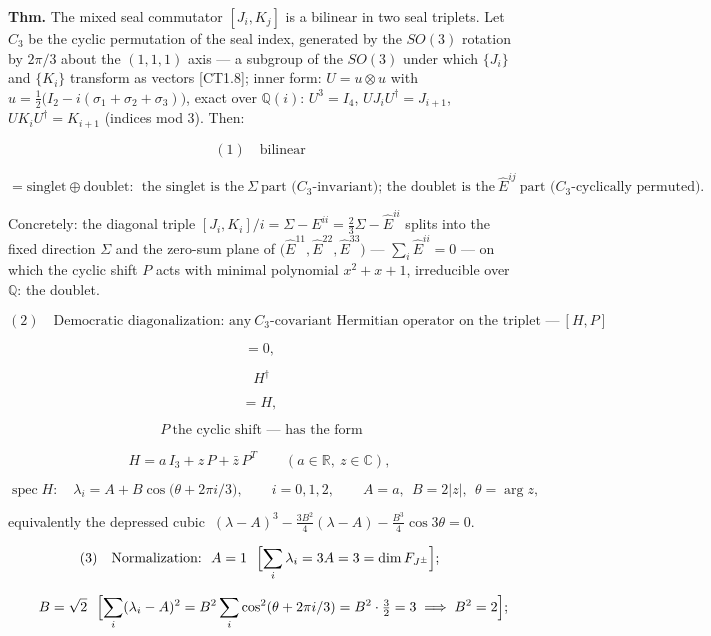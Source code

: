 \begin{theorem}\label{tag:FT-111}
\textbf{Thm.} The mixed seal commutator $[J_i,K_j]$ is a bilinear in two seal triplets. Let $C_3$ be the cyclic permutation of the seal index, generated by the $SO(3)$ rotation by $2\pi/3$ about the $(1,1,1)$ axis — a subgroup of the $SO(3)$ under which $\{J_i\}$ and $\{K_i\}$ transform as vectors [CT1.8]; inner form: $U=u\otimes u$ with $u=\tfrac12\bigl(I_2-i(\sigma_1+\sigma_2+\sigma_3)\bigr)$, exact over $\mathbb Q(i)$: $U^3=I_4$, $UJ_iU^\dagger=J_{i+1}$, $UK_iU^\dagger=K_{i+1}$ (indices mod $3$). Then:

\[
(1)\quad\text{bilinear}
\]

\[
= \text{singlet}\oplus\text{doublet}:\ \ \text{the singlet is the}\ \Sigma\ \text{part (}C_3\text{-invariant); the doublet is the}\ \hat E^{ij}\ \text{part (}C_3\text{-cyclically permuted).}
\]

Concretely: the diagonal triple $[J_i,K_i]/i=\Sigma-E^{ii}=\tfrac23\Sigma-\hat E^{ii}$ splits into the fixed direction $\Sigma$ and the zero-sum plane of $\bigl(\hat E^{11},\hat E^{22},\hat E^{33}\bigr)$ — $\sum_i\hat E^{ii}=0$ — on which the cyclic shift $P$ acts with minimal polynomial $x^2+x+1$, irreducible over $\mathbb Q$: the doublet.

\[
(2)\quad\text{Democratic diagonalization: any}\ C_3\text{-covariant Hermitian operator on the triplet —}\ [H,P]
\]

\[
= 0,
\]

\[
\ H^\dagger
\]

\[
= H,
\]

\[
\ P\ \text{the cyclic shift — has the form}
\]

\[
H=a\,I_3+z\,P+\bar z\,P^{T}\qquad(a\in\mathbb R,\ z\in\mathbb C),
\]

\[
\operatorname{spec}H:\quad\lambda_i=A+B\cos\bigl(\theta+2\pi i/3\bigr),\qquad i=0,1,2,\qquad A=a,\ \ B=2|z|,\ \ \theta=\arg z,
\]

equivalently the depressed cubic $\ (\lambda-A)^3-\tfrac{3B^2}{4}(\lambda-A)-\tfrac{B^3}{4}\cos3\theta=0$.

\[
(3)\quad\text{Normalization:}\ \ A=1\ \ \Bigl[\sum_i\lambda_i=3A=3=\dim F_{J^\pm}\Bigr];
\]

\[
\qquad B=\sqrt2\ \ \Bigl[\sum_i(\lambda_i-A)^2=B^2\sum_i\cos^2(\theta+2\pi i/3)=B^2\cdot\tfrac32=3\implies B^2=2\Bigr];
\]


\end{theorem}
